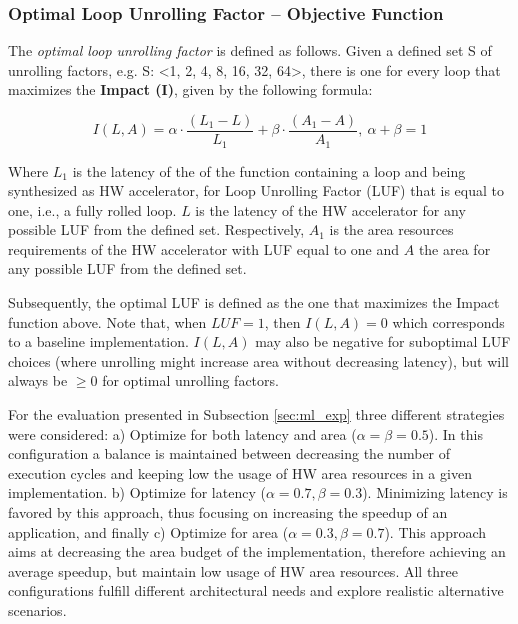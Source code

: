 \documentclass[]{usiinfthesis}
\begin{document}
\subsubsection{Optimal Loop Unrolling Factor -- Objective Function}

The {\em optimal loop unrolling factor} is defined as follows.
Given a defined set S of unrolling factors, e.g. S: <1, 2, 4, 8, 16, 32, 64>, there is one for every
loop that maximizes the \textbf {Impact (I)}, given by the following formula:

$$I(L,A)= \alpha  \cdot \dfrac{ (L_1 - L)} {L_1} + \beta \cdot \dfrac{ (A_1 - A)} {A_1},\ \alpha + \beta = 1$$

Where $L_1$ is the latency of the of the function containing a loop and being synthesized as HW 
accelerator, for Loop Unrolling Factor (LUF) that is equal to one, i.e., a fully rolled loop. $L$ 
is the latency of the HW accelerator for any possible LUF from the defined set.
Respectively, $A_1$ is the area resources requirements of the HW accelerator with LUF equal to one and 
$A$ the area for any possible LUF from the defined set.\par

Subsequently, the optimal LUF is defined as the one that maximizes the Impact function above. Note that, 
when $LUF = 1$, then $I(L,A)=0$ which corresponds to a baseline implementation. $I(L,A)$ may also 
be negative for suboptimal LUF choices (where unrolling might increase area without decreasing 
latency), but will always be $\ge 0$ for optimal unrolling factors.\par


For the evaluation presented in Subsection \ref{sec:ml_exp}
three different strategies were considered: a) Optimize for both latency and area ($\alpha = 
\beta = 0.5$). In this configuration a balance is maintained between decreasing the number of 
execution cycles and keeping low the usage of HW area resources in a given implementation.
b) Optimize for latency ($\alpha = 0.7, \beta = 0.3$). Minimizing latency is favored by this
approach, thus focusing on increasing the speedup of an application, and finally c) Optimize
for area ($\alpha = 0.3, \beta = 0.7$). This approach aims at decreasing the area budget of 
the implementation, therefore achieving an average speedup, but maintain low usage of HW 
area resources. All three configurations fulfill different architectural needs and explore 
realistic alternative scenarios.\par

\end{document}

